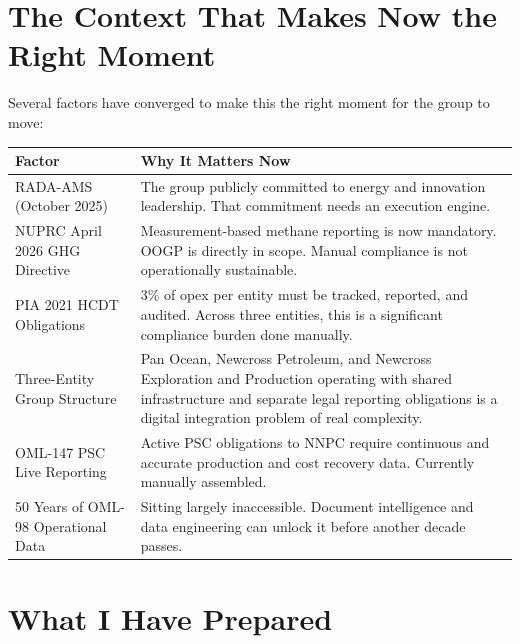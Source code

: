\documentclass[10pt]{article}
\begin{document}
\vspace{6pt}

\section{The Context That Makes Now the Right Moment}

Several factors have converged to make this the right moment for the group
to move:

\vspace{4pt}
\small
\begin{tabularx}{\columnwidth}{@{}lX@{}}
\toprule
\textbf{Factor} & \textbf{Why It Matters Now} \\
\midrule
RADA-AMS (October 2025)
  & The group publicly committed to energy and innovation leadership.
    That commitment needs an execution engine. \\[3pt]
NUPRC April 2026 GHG Directive
  & Measurement-based methane reporting is now mandatory. OOGP is directly in
    scope. Manual compliance is not operationally sustainable. \\[3pt]
PIA 2021 HCDT Obligations
  & 3\% of opex per entity must be tracked, reported, and audited. Across
    three entities, this is a significant compliance burden done manually. \\[3pt]
Three-Entity Group Structure
  & Pan Ocean, Newcross Petroleum, and Newcross Exploration and Production
    operating with shared infrastructure and separate legal reporting
    obligations is a digital integration problem of real complexity. \\[3pt]
OML-147 PSC Live Reporting
  & Active PSC obligations to NNPC require continuous and accurate production
    and cost recovery data. Currently manually assembled. \\[3pt]
50 Years of OML-98 Operational Data
  & Sitting largely inaccessible. Document intelligence and data engineering
    can unlock it before another decade passes. \\
\bottomrule
\end{tabularx}
\normalsize

\vspace{6pt}

\section{What I Have Prepared}
\end{document}
